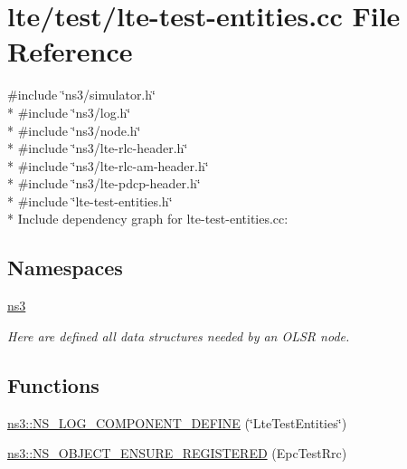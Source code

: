 \hypertarget{lte-test-entities_8cc}{}\section{lte/test/lte-\/test-\/entities.cc File Reference}
\label{lte-test-entities_8cc}
{\ttfamily \#include \char`\"{}ns3/simulator.\+h\char`\"{}}\\*
{\ttfamily \#include \char`\"{}ns3/log.\+h\char`\"{}}\\*
{\ttfamily \#include \char`\"{}ns3/node.\+h\char`\"{}}\\*
{\ttfamily \#include \char`\"{}ns3/lte-\/rlc-\/header.\+h\char`\"{}}\\*
{\ttfamily \#include \char`\"{}ns3/lte-\/rlc-\/am-\/header.\+h\char`\"{}}\\*
{\ttfamily \#include \char`\"{}ns3/lte-\/pdcp-\/header.\+h\char`\"{}}\\*
{\ttfamily \#include \char`\"{}lte-\/test-\/entities.\+h\char`\"{}}\\*
Include dependency graph for lte-\/test-\/entities.cc\+:
\subsection*{Namespaces}
\begin{DoxyCompactItemize}
\item 
 \hyperlink{namespacens3}{ns3}
\begin{DoxyCompactList}\small\item\em Here are defined all data structures needed by an O\+L\+SR node. \end{DoxyCompactList}\end{DoxyCompactItemize}
\subsection*{Functions}
\begin{DoxyCompactItemize}
\item 
\hyperlink{namespacens3_a71e336499f391f4dbbf42a7fba6185d1}{ns3\+::\+N\+S\+\_\+\+L\+O\+G\+\_\+\+C\+O\+M\+P\+O\+N\+E\+N\+T\+\_\+\+D\+E\+F\+I\+NE} (\char`\"{}Lte\+Test\+Entities\char`\"{})
\item 
\hyperlink{namespacens3_a85724391dafb389f89305e0826fe25d3}{ns3\+::\+N\+S\+\_\+\+O\+B\+J\+E\+C\+T\+\_\+\+E\+N\+S\+U\+R\+E\+\_\+\+R\+E\+G\+I\+S\+T\+E\+R\+ED} (Epc\+Test\+Rrc)
\end{DoxyCompactItemize}
